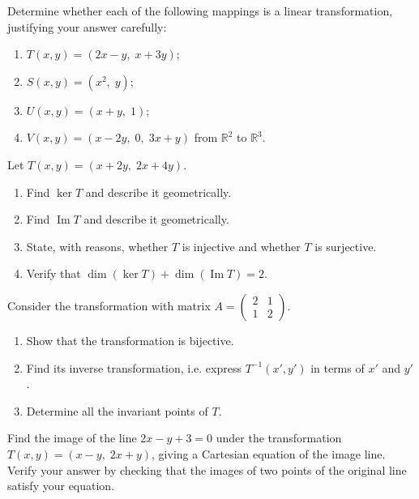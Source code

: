 \documentclass[11pt]{article}
\newcounter{popsec}
\newcounter{popsub}
\newcommand{\courssub}[1]{%
  \stepcounter{popsub}%
  \par\vspace{9pt}\noindent{\popxbold\fontsize{11.5}{13}\selectfont\color{popink}{\color{poporange}\thepopsec.\thepopsub}\hspace{6pt}#1}\par\nopagebreak\vspace{4pt}
}
\begin{document}
\courssub{I practise}

\begin{exercice}
Determine whether each of the following mappings is a linear transformation, justifying your answer carefully:
\begin{enumerate}
\item $T(x,y)=(2x-y,\;x+3y)$;
\item $S(x,y)=(x^{2},\;y)$;
\item $U(x,y)=(x+y,\;1)$;
\item $V(x,y)=(x-2y,\;0,\;3x+y)$ from $\mathbb{R}^{2}$ to $\mathbb{R}^{3}$.
\end{enumerate}
\end{exercice}

\begin{exercice}
Let $T(x,y)=(x+2y,\;2x+4y)$.
\begin{enumerate}
\item Find $\ker T$ and describe it geometrically.
\item Find $\operatorname{Im} T$ and describe it geometrically.
\item State, with reasons, whether $T$ is injective and whether $T$ is surjective.
\item Verify that $\dim(\ker T)+\dim(\operatorname{Im} T)=2$.
\end{enumerate}
\end{exercice}

\begin{exercice}
Consider the transformation with matrix $A=\begin{pmatrix} 2 & 1 \\ 1 & 2 \end{pmatrix}$.
\begin{enumerate}
\item Show that the transformation is bijective.
\item Find its inverse transformation, i.e. express $T^{-1}(x',y')$ in terms of $x'$ and $y'$.
\item Determine all the invariant points of $T$.
\end{enumerate}
\end{exercice}

\begin{exercice}
Find the image of the line $2x-y+3=0$ under the transformation $T(x,y)=(x-y,\;2x+y)$, giving a Cartesian equation of the image line. Verify your answer by checking that the images of two points of the original line satisfy your equation.
\end{exercice}
\end{document}

